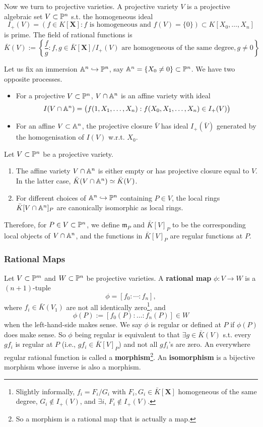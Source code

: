 Now we turn to projective varieties. A projective variety $V$ is a projective algebraic set $V\subset\P^n$ s.t. the homogeneous ideal \[I_+(V) = (f\in K[\boldsymbol{X}] : f\text{ is homogeneous and }f(V) = \{0\})\subset K[X_0, \dots, X_n]\] is prime. The field of rational functions is \[\bar{K}(V) := \left\{ \frac{f}{g} : f, g\in \bar{K}[\boldsymbol{X}]\big/I_+(V)\text{ are homogeneous of the same degree}, g\ne 0 \right\}\]

Let us fix an immersion $\A^n\inject \P^n$, say $\A^n = \{X_0\ne 0\}\subset\P^n$. We have two opposite processes.
\begin{itemize}
    \item For a projective $V\subset \P^n$, $V\cap \A^n$ is an affine variety with ideal \[I(V\cap \A^n) = \big(f(1, X_1, \dots, X_n) : f(X_0, X_1,\dots, X_n)\in I_+(V)\big)\] 
    \item For an affine $V\subset \A^n$, the projective closure $\bar{V}$ has ideal $I_+(\bar{V})$ generated by the homogenisation of $I(V)$ w.r.t. $X_0$.
\end{itemize}
\begin{proposition}
    Let $V\subset\P^n$ be a projective variety.\begin{enumerate}
        \item The affine variety $V\cap \A^n$ is either empty or has projective closure equal to $V$. In the latter case, $\bar{K}(V\cap \A^n)\simeq \bar{K}(V)$.
        \item For different choices of $\A^n\inject \P^n$ containing $P\in V$, the local rings $\bar{K}[V\cap \A^n]_P$ are canonically isomorphic as local rings.
    \end{enumerate}
\end{proposition}
Therefore, for $P\in V\subset\P^n$, we define $\mathfrak{m}_P$ and $\bar{K}[V]_P$ to be the corresponding local objects of $V\cap \A^n$, and the functions in $\bar{K}[V]_P$ are regular functions at $P$. 

\subsubsection{Rational Maps}
Let $V\subset\P^m$ and $W\subset \P^n$ be projective varieties.
A \textbf{rational map} $\phi : V\to W$ is a $(n+1)$-tuple \[\phi = [f_0 : \cdots : f_n],\]
where $f_i\in \bar{K}(V_1)$ are not all identically zero\footnote{Slightly informally, $f_i = F_i/G_i$ with $F_i, G_i\in\bar{K}[\boldsymbol{X}]$ homogeneous of the same degree, $G_i\notin I_+(V)$, and $\exists i$, $F_i\notin I_+(V)$.},
and \[\phi(P) := [f_0(P): \dots : f_n(P)]\in W\] when the left-hand-side makes sense.
We say $\phi$ is regular or defined at $P$ if $\phi(P)$ does make sense. So $\phi$ being regular is equivalent to that $\exists g\in \bar{K}(V)$ s.t. every $gf_i$ is regular at $P$ (i.e., $gf_i\in \bar{K}[V]_P$) and not all $gf_i$'s are zero.
An everywhere regular rational function is called a \textbf{morphism}\footnote{So a morphism is a rational map that is actually a map.}.
An \textbf{isomorphism} is a bijective morphism whose inverse is also a morphism.

